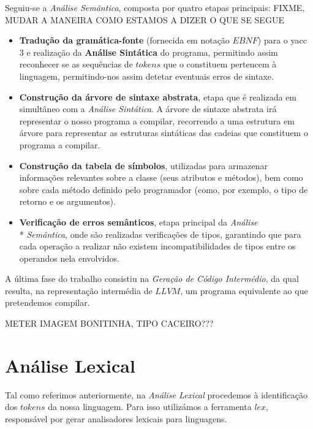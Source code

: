 \documentclass[11pt,a4paper]{article}
\begin{document}
Seguiu-se a \emph{Análise Semântica}, composta por quatro etapas principais: FIXME, MUDAR A MANEIRA COMO ESTAMOS A DIZER O QUE SE SEGUE

\begin{itemize}
\item \textbf{Tradução da gramática-fonte} (fornecida em notação $EBNF$) para o yacc 3 e realização da \textbf{Análise Sintática} do programa, permitindo assim reconhecer se as sequências de $tokens$ que o constituem pertencem à linguagem, permitindo-nos assim detetar eventuais erros de sintaxe.

\item \textbf{Construção da árvore de sintaxe abstrata}, etapa que é realizada em simultâneo com a \emph{Análise Sintática}. A árvore de sintaxe abstrata irá representar o nosso programa a compilar, recorrendo a uma estrutura em árvore para representar as estruturas sintáticas das cadeias que constituem o programa a compilar.

\item \textbf{Construção da tabela de símbolos}, utilizadas para armazenar informações relevantes sobre a classe (seus atributos e métodos), bem como sobre cada método definido pelo programador (como, por exemplo, o tipo de retorno e os argumentos).

\item \textbf{Verificação de erros semânticos}, etapa principal da \emph{Análise} \\* \emph{Semântica}, onde são realizadas verificações de tipos, garantindo que para cada operação a realizar não existem incompatibilidades de tipos entre os operandos nela envolvidos.

\end{itemize}

A última fase do trabalho consistiu na \emph{Geração de Código Intermédio}, da qual resulta, na representação intermédia de $LLVM$, um programa equivalente ao que pretendemos compilar.

METER IMAGEM BONITINHA, TIPO CACEIRO???

\pagebreak

\section{Análise Lexical}

Tal como referimos anteriormente, na \emph{Análise Lexical} procedemos à identificação dos $tokens$ da nossa linguagem. Para isso utilizámos a ferramenta $lex$, responsável por gerar analisadores lexicais para linguagens.
\end{document}
